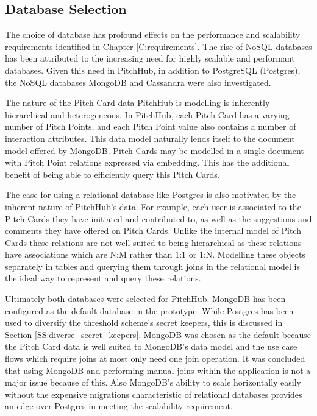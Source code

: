 \subsection{Database Selection}\label{SS:databaseSelection}

The choice of database has profound effects on the performance and scalability requirements identified in Chapter \ref{C:requirements}. The rise of NoSQL databases has been attributed to the increasing need for highly scalable and performant databases. Given this need in PitchHub, in addition to PostgreSQL (Postgres), the NoSQL databases MongoDB and Cassandra were also investigated.
\par
The nature of the Pitch Card data PitchHub is modelling is inherently hierarchical and heterogeneous. In PitchHub, each Pitch Card has a varying number of Pitch Points, and each Pitch Point value also contains a number of interaction attributes. This data model naturally lends itself to the document model offered by MongoDB. Pitch Cards may be modelled in a single document with Pitch Point relations expressed via embedding. This has the additional benefit of being able to efficiently query this Pitch Cards.
\par
The case for using a relational database like Postgres is also motivated by the inherent nature of PitchHub's data. For example, each user is associated to the Pitch Cards they have initiated and contributed to, as well as the suggestions and comments they have offered on Pitch Cards. Unlike the internal model of Pitch Cards these relations are not well suited to being hierarchical as these relations have associations which are N:M rather than 1:1 or 1:N. Modelling these objects separately in tables and querying them through joins in the relational model is the ideal way to represent and query these relations.
\par
Ultimately both databases were selected for PitchHub. MongoDB has been configured as the default database in the prototype. While Postgres has been used to diversify the threshold scheme's secret keepers, this is discussed in Section \ref{SS:diverse_secret_keepers}. MongoDB was chosen as the default because the Pitch Card data is well suited to MongoDB's data model and the use case flows which require joins at most only need one join operation. It was concluded that using MongoDB and performing manual joins within the application is not a major issue because of this. Also MongoDB's ability to scale horizontally easily without the expensive migrations characteristic of relational databases provides an edge over Postgres in meeting the scalability requirement.
